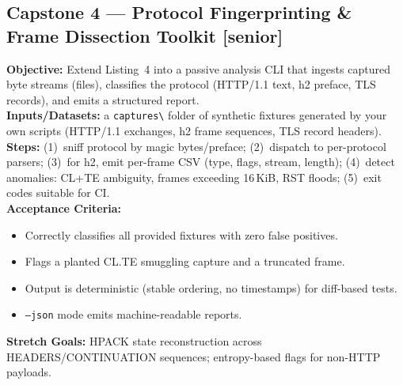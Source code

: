\subsection{Capstone 4 --- Protocol Fingerprinting \& Frame Dissection Toolkit [senior]}
\textbf{Objective:} Extend Listing~4 into a passive analysis CLI that ingests captured byte streams (files), classifies the protocol (HTTP/1.1 text, h2 preface, TLS records), and emits a structured report.\\
\textbf{Inputs/Datasets:} a \texttt{captures\textbackslash} folder of synthetic fixtures generated by your own scripts (HTTP/1.1 exchanges, h2 frame sequences, TLS record headers).\\
\textbf{Steps:} (1)~sniff protocol by magic bytes/preface; (2)~dispatch to per-protocol parsers; (3)~for h2, emit per-frame CSV (type, flags, stream, length); (4)~detect anomalies: CL+TE ambiguity, frames exceeding 16\,KiB, RST floods; (5)~exit codes suitable for CI.\\
\textbf{Acceptance Criteria:}
\begin{itemize}
  \item[$\square$] Correctly classifies all provided fixtures with zero false positives.
  \item[$\square$] Flags a planted CL.TE smuggling capture and a truncated frame.
  \item[$\square$] Output is deterministic (stable ordering, no timestamps) for diff-based tests.
  \item[$\square$] \texttt{--json} mode emits machine-readable reports.
\end{itemize}
\textbf{Stretch Goals:} HPACK state reconstruction across HEADERS/CONTINUATION sequences; entropy-based flags for non-HTTP payloads.


